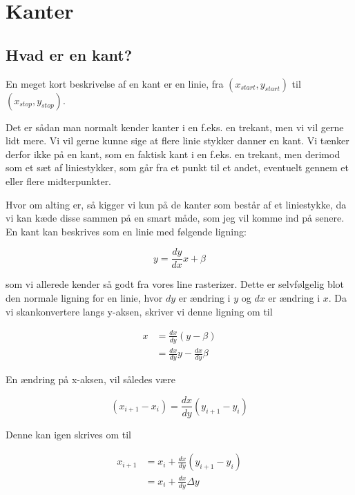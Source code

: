 \documentclass[a4paper, 10pt]{article}
\begin{document}
\section{Kanter}

\subsection{Hvad er en kant?}
En meget kort beskrivelse af en kant er en linie, fra $(x_{start}, y_{start})$ til $(x_{stop}, y_{stop})$.

Det er sådan man normalt kender kanter i en f.eks. en trekant, men vi vil gerne lidt mere.
Vi vil gerne kunne sige at flere linie stykker danner en kant.
Vi tænker derfor ikke på en kant, som en faktisk kant i en f.eks. en trekant, men derimod som et sæt af liniestykker, som går fra et punkt til et andet, eventuelt gennem et eller flere midterpunkter.

Hvor om alting er, så kigger vi kun på de kanter som består af et liniestykke, da vi kan kæde disse sammen på en smart måde, som jeg vil komme ind på senere.
En kant kan beskrives som en linie med følgende ligning:

\begin{equation}
y = \frac{dy}{dx} x + \beta \nonumber 
\end{equation}

som vi allerede kender så godt fra vores line rasterizer. Dette er selvfølgelig blot den normale ligning for en linie, hvor $dy$ er ændring i $y$ og $dx$ er ændring i $x$.
Da vi skankonvertere langs y-aksen, skriver vi denne ligning om til

\begin{align}
x &= \frac{dx}{dy} (y - \beta) \nonumber\\
  &= \frac{dx}{dy} y - \frac{dx}{dy} \beta \nonumber
\end{align}

En ændring på x-aksen, vil således være 

\begin{equation}
( x_{i+1} - x_i ) = \frac{dx}{dy} ( y_{i+1} - y_i ) \nonumber
\end{equation}

Denne kan igen skrives om til

\begin{align}
x_{i+1} &= x_i + \frac{dx}{dy} ( y_{i+1} - y_i ) \nonumber\\
        &= x_i + \frac{dx}{dy} \Delta y \nonumber
\end{align}
\end{document}
